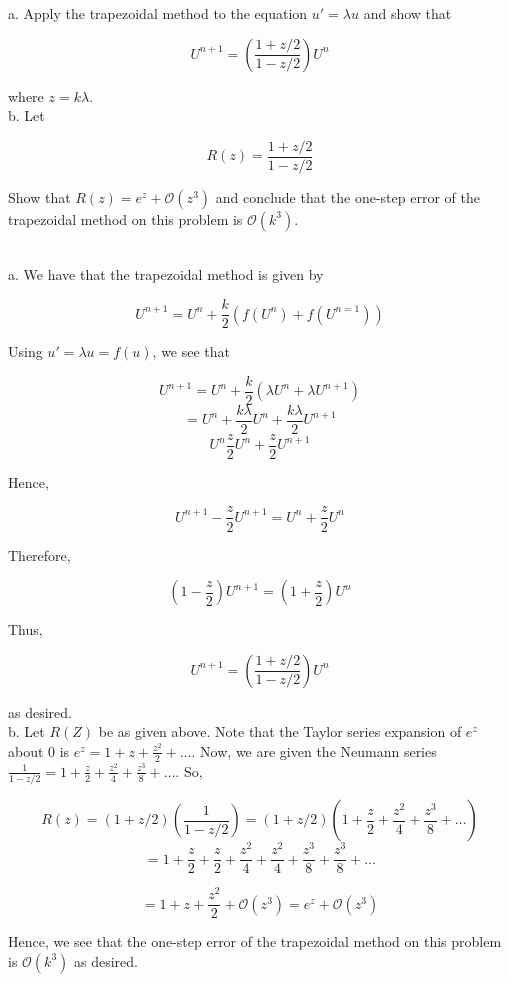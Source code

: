 a. Apply the trapezoidal method to the equation $u'=\lambda u$ and show that

$$U^{n+1}=(\frac{1+z/2}{1-z/2})U^n$$

where $z=k\lambda$.\\

b. Let

$$R(z)=\frac{1+z/2}{1-z/2}$$

Show that $R(z)=e^z+\mathcal{O}(z^3)$ and conclude that the one-step error of the trapezoidal method
on this problem is $\mathcal{O}(k^3)$.\\

\begin{solution}\renewcommand{\qedsymbol}{}\ \\
    a. We have that the trapezoidal method is given by

    $$U^{n+1}=U^n+\frac{k}{2}(f(U^n)+f(U^{n=1}))$$

    Using $u'=\lambda u=f(u)$, we see that

    $$U^{n+1}=U^n+\frac{k}{2}(\lambda U^n+\lambda U^{n+1})$$
    $$=U^n+\frac{k\lambda}{2}U^n+\frac{k\lambda}{2}U^{n+1}$$
    $$U^n\frac{z}{2}U^n+\frac{z}{2}U^{n+1}$$

    Hence,

    $$U^{n+1}-\frac{z}{2}U^{n+1}=U^n+\frac{z}{2}U^n$$

    Therefore,

    $$(1-\frac{z}{2})U^{n+1}=(1+\frac{z}{2})U^n$$

    Thus,

    $$U^{n+1}=(\frac{1+z/2}{1-z/2})U^n$$

    as desired.\\

    b. Let $R(Z)$ be as given above. Note that the Taylor series expansion of $e^z$ about 0 is
    $e^z=1+z+\frac{z^2}{2}+\ldots$. Now, we are given the Neumann series
    $\frac{1}{1-z/2}=1+\frac{z}{2}+\frac{z^2}{4}+\frac{z^3}{8}+\ldots$. So,

    $$R(z)=(1+z/2)(\frac{1}{1-z/2})=(1+z/2)(1+\frac{z}{2}+\frac{z^2}{4}+\frac{z^3}{8}+\ldots)$$
    $$=1+\frac{z}{2}+\frac{z}{2}+\frac{z^2}{4}+\frac{z^2}{4}+\frac{z^3}{8}+\frac{z^3}{8}+\ldots$$

    $$=1+z+\frac{z^2}{2}+\mathcal{O}(z^3)=e^z+\mathcal{O}(z^3)$$

    Hence, we see that the one-step error of the trapezoidal method on this problem is
    $\mathcal{O}(k^3)$ as desired.

\end{solution}